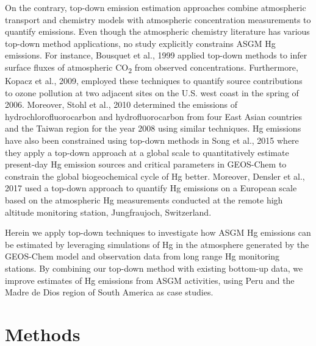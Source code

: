 \begin{flushleft}
On the contrary, top-down emission estimation approaches combine atmospheric transport and chemistry models with atmospheric concentration measurements to quantify emissions. Even though the atmospheric chemistry literature has various top-down method applications, no study explicitly constrains ASGM Hg emissions. For instance, Bousquet et al., 1999 applied top-down methods to infer surface fluxes of atmospheric CO\textsubscript{2} from observed concentrations\cite{bousquet_inverse_1999}. Furthermore, Kopacz et al., 2009, employed these techniques to quantify source contributions to ozone pollution at two adjacent sites on the U.S. west coast in the spring of 2006. Moreover, Stohl et al., 2010 determined the emissions of hydrochlorofluorocarbon and hydrofluorocarbon from four East Asian countries and the Taiwan region for the year 2008 using similar techniques. Hg emissions have also been constrained using top-down methods in Song et al., 2015 where they apply a top-down approach at a global scale to quantitatively estimate present-day Hg emission sources and critical parameters in GEOS-Chem to constrain the global biogeochemical cycle of Hg better. Moreover, Densler et al., 2017 used a top-down approach to quantify Hg emissions on a European scale based on the atmospheric Hg measurements conducted at the remote high altitude monitoring station, Jungfraujoch, Switzerland. 
\end{flushleft}
\begin{flushleft}
Herein we apply top-down techniques to investigate how ASGM Hg emissions can be estimated by leveraging simulations of Hg in the atmosphere generated by the GEOS-Chem model and observation data from long range Hg monitoring stations. By combining our top-down method with existing bottom-up data, we improve estimates of Hg emissions from ASGM activities, using Peru and the Madre de Dios region of South America as case studies.
\end{flushleft}

\section{Methods}

